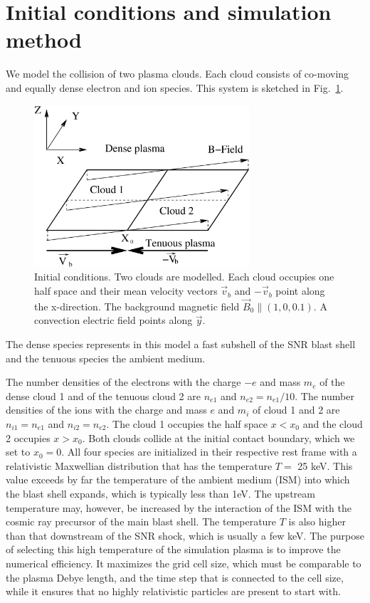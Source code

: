 \documentclass[structabstract]{aa}
\begin{document}
\section{Initial conditions and simulation method}

We model the collision of two plasma clouds. Each cloud consists of 
co-moving and equally dense electron and ion species. This system is 
sketched in Fig.~\ref{Fig1}. 
\begin{figure}
\centering
\includegraphics[width=8cm]{Fig1.eps}
\caption{Initial conditions. Two clouds are modelled. Each cloud occupies 
one half space and their mean velocity vectors $\vec{v}_{b}$ and $-\vec{v}_b$ 
point along the x-direction. The background magnetic field $\vec{B}_0 
\parallel (1,0,0.1)$. A convection electric field points along $\vec{y}$.}
\label{Fig1}
\end{figure}
The dense species represents in this model a fast subshell of the SNR 
blast shell and the tenuous species the ambient medium.

The number densities of the electrons with the charge $-e$ and mass $m_e$ 
of the dense cloud 1 and of the tenuous cloud 2 are $n_{e1}$ and $n_{e2} = 
n_{e1}/10$. The number densities of the ions with the charge and mass $e$ 
and $m_i$ of cloud 1 and 2 are $n_{i1}=n_{e1}$ and $n_{i2}=n_{e2}$. The 
cloud 1 occupies the half space $x< x_0$ and the cloud 2 occupies $x>x_0$.
Both clouds collide at the initial contact boundary, which we set to
$x_0 = 0$. All four species are initialized in their respective rest
frame with a relativistic Maxwellian distribution that has the temperature 
$T =$ 25 keV. This value exceeds by far the temperature of the ambient 
medium (ISM) into which the blast shell expands, which is typically less
than 1eV. The upstream temperature may, however, be increased by the
interaction of the ISM with the cosmic ray precursor of the main blast 
shell. The temperature $T$ is also higher than that downstream of the SNR 
shock, which is usually a few keV. The purpose of selecting this high
temperature of the simulation plasma is to improve the numerical efficiency. 
It maximizes the grid cell size, which must be comparable to the plasma 
Debye length, and the time step that is connected to the cell size, while 
it ensures that no highly relativistic particles are present to start with.
\end{document}
